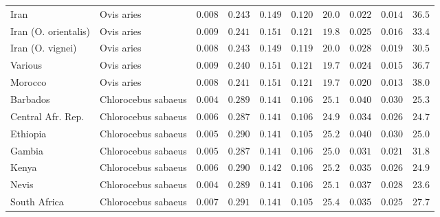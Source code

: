 \documentclass{article}
\begin{document}
\begin{center}
\begin{longtable}{|l|l|r|r|r|r|r|r|r|r|}
            Iran                 & Ovis aries          & $ 0.008$              & $ 0.243$                      & $ 0.149$ & $ 0.120$     & $  20.0$      & $ 0.022$ & $ 0.014$   & $  36.5$    \\
            Iran (O. orientalis) & Ovis aries          & $ 0.009$              & $ 0.241$                      & $ 0.151$ & $ 0.121$     & $  19.8$      & $ 0.025$ & $ 0.016$ & $  33.4$ \\
            Iran (O. vignei)     & Ovis aries          & $ 0.008$              & $ 0.243$                      & $ 0.149$ & $ 0.119$     & $  20.0$      & $ 0.028$ & $ 0.019$ & $  30.5$ \\
            Various              & Ovis aries          & $ 0.009$              & $ 0.240$                      & $ 0.151$ & $ 0.121$     & $  19.7$      & $ 0.024$ & $ 0.015$   & $  36.7$    \\
            Morocco              & Ovis aries          & $ 0.008$              & $ 0.241$                      & $ 0.151$ & $ 0.121$     & $  19.7$      & $ 0.020$ & $ 0.013$   & $  38.0$    \\
            Barbados             & Chlorocebus sabaeus & $ 0.004$              & $ 0.289$                      & $ 0.141$ & $ 0.106$     & $  25.1$      & $ 0.040$ & $ 0.030$ & $  25.3$ \\
            Central Afr. Rep.    & Chlorocebus sabaeus & $ 0.006$              & $ 0.287$                      & $ 0.141$ & $ 0.106$     & $  24.9$ & $ 0.034$ & $ 0.026$ & $  24.7$ \\
            Ethiopia             & Chlorocebus sabaeus & $ 0.005$              & $ 0.290$                      & $ 0.141$ & $ 0.105$     & $  25.2$      & $ 0.040$ & $ 0.030$ & $  25.0$ \\
            Gambia               & Chlorocebus sabaeus & $ 0.005$              & $ 0.287$                      & $ 0.141$ & $ 0.106$     & $  25.0$      & $ 0.031$ & $ 0.021$ & $  31.8$ \\
            Kenya                & Chlorocebus sabaeus & $ 0.006$              & $ 0.290$                      & $ 0.142$ & $ 0.106$     & $  25.2$      & $ 0.035$ & $ 0.026$ & $  24.9$ \\
            Nevis                & Chlorocebus sabaeus & $ 0.004$              & $ 0.289$                      & $ 0.141$ & $ 0.106$     & $  25.1$      & $ 0.037$ & $ 0.028$ & $  23.6$ \\
            South Africa         & Chlorocebus sabaeus & $ 0.007$              & $ 0.291$                      & $ 0.141$ & $ 0.105$     & $  25.4$      & $ 0.035$ & $ 0.025$ & $  27.7$ \\

\end{longtable}
\end{center}
\end{document}
